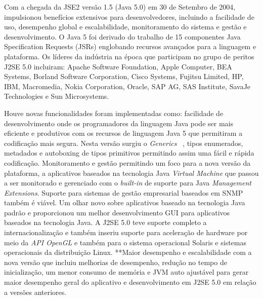 Com a chegada da \acs{JSE2} versão 1.5 (Java 5.0) em 30 de Setembro de 2004, impulsionou benefícios extensivos para desenvolvedores, incluindo a facilidade de uso, desempenho global e escalabilidade, monitoramento do sistema e gestão e desenvolvimento. O Java 5 foi derivado do trabalho de 15 componentes Java Specification Requests (JSRs) englobando recursos avançados para a linguagem e plataforma. Os líderes da indústria na época que participam no grupo de peritos J2SE 5.0 incluiram: Apache Software Foundation, Apple Computer, BEA Systems, Borland Software Corporation, Cisco Systems, Fujitsu Limited, HP, IBM, Macromedia, Nokia Corporation, Oracle, SAP AG, SAS Institute, SavaJe Technologies e Sun Microsystems.

Houve novas funcionalidades foram implementadas como: facilidade de desenvolvimento onde os programadores da linguagem Java pode ser mais eficiente e produtivos com os recursos de linguagem Java 5 que permitiram a codificação mais segura. Nesta versão surgiu o {\it Generics} ~\cite{OracleGenerics, bracha1998gj}, tipos enumerados, metadados e autoboxing de tipos primitivos permitindo assim uma fácil e rápida codificação. Monitoramento e gestão permitindo um foco para a nova versão da plataforma, a aplicativos baseados na tecnologia Java {\it Virtual Machine} que passou a ser monitorado e gerenciado com o {\it built-in} de suporte para Java {\it Management Extensions}. Suporte para sistemas de gestão empresarial baseados em SNMP também é viável. Um olhar novo sobre aplicativos baseado na tecnologia Java padrão e proporcionou um melhor desenvolvimento GUI para aplicativos baseados na tecnologia Java. A J2SE 5.0 teve suporte completo a internacionalização e também inseriu suporte para aceleração de hardware por meio da {\it API OpenGL } e também para o sistema operacional Solaris e sistemas operacionais da distribuição Linux. **Maior desempenho e escalabilidade com a nova versão que incluiu melhorias de desempenho, redução no tempo de inicialização, um menor consumo de memória e JVM auto ajustável para gerar maior desempenho geral do aplicativo e desenvolvimento em J2SE 5.0 em relação a versões anteriores.

